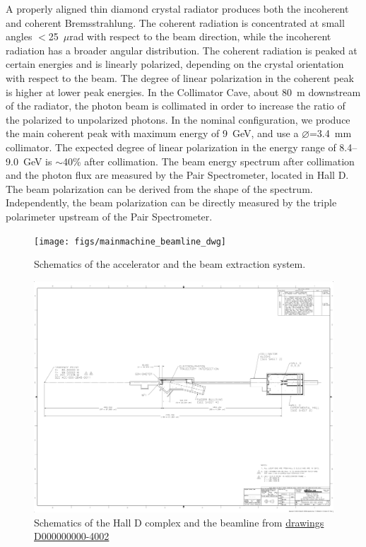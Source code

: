 A properly aligned thin diamond crystal radiator produces both the
incoherent and coherent Bremsstrahlung. The coherent radiation is
concentrated at small angles $<$25~$\mu$rad with respect to the beam
direction, while the incoherent radiation has a broader angular
distribution.  The coherent radiation is peaked at certain energies
and is linearly polarized, depending on the crystal orientation with
respect to the beam. The degree of linear polarization in the coherent
peak is higher at lower peak energies. In the Collimator Cave, about
80~m downstream of the radiator, the photon beam is collimated in
order to increase the ratio of the polarized to unpolarized photons.  In
the nominal \GX{} configuration, we produce the main coherent peak
with maximum energy of 9~GeV, and use a $\diameter$=3.4~mm collimator.
The expected degree of linear polarization in the energy range of
8.4--9.0~GeV is $\sim$40\% after collimation. The beam energy spectrum
after collimation and the photon flux are measured by the Pair
Spectrometer, located in Hall D. The beam polarization can be derived
from the shape of the spectrum. Independently, the beam polarization
can be directly measured by the triple polarimeter upstream of the
Pair Spectrometer.
 
\begin{figure}[t]
\begin{center}
   \texttt{[image: figs/mainmachine\_beamline\_dwg]}
\end{center}
\caption{Schematics of the accelerator and the beam extraction system.
        }
\label{fig:beam:cebaf-dwg} 
\end{figure}
\begin{figure}[h]
\begin{center}
   \includegraphics[page=1,viewport=1001 991 3020 1700,clip,angle=0,width=0.98\linewidth]{figures/D000000000-4002_RevB}
\end{center}
\caption{Schematics of the Hall D complex and the beamline 
         from \href{https://misportal.jlab.org/jlabDocs/document.seam?id=80930}{drawings D000000000-4002}
        }
\label{fig:beam:halld-tot} 
\end{figure}

